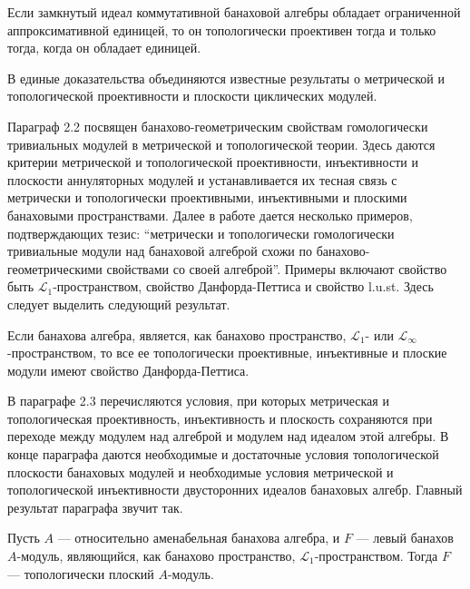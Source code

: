 \begin{theorem*}[\ref{GoodCommIdealMetTopProjIsUnital}] Если замкнутый идеал
коммутативной банаховой алгебры обладает ограниченной аппроксимативной единицей,
то он топологически проективен тогда и только тогда, когда он обладает единицей.
\end{theorem*} 

В единые доказательства объединяются известные результаты о метрической и
топологической проективности и плоскости циклических модулей. 

Параграф 2.2 посвящен банахово-геометрическим свойствам гомологически
тривиальных модулей в метрической и топологической теории. Здесь даются критерии
метрической и топологической проективности, инъективности и плоскости
аннуляторных модулей и устанавливается их тесная связь с метрически и
топологически проективными, инъективными и плоскими банаховыми пространствами.
Далее в работе дается несколько примеров, подтверждающих тезис: ``метрически и
топологически гомологически тривиальные модули над банаховой алгеброй схожи по
банахово-геометрическими свойствами со своей алгеброй''. Примеры включают
свойство быть $\mathscr{L}_1$-пространством, свойство Данфорда-Петтиса и
свойство l.u.st. Здесь следует выделить следующий результат.

\begin{theorem*}[\ref{TopProjInjFlatModOverMthscrL1OrLInftySpHaveDPP}] Если
банахова алгебра, является, как банахово пространство, $\mathscr{L}_1$- или
$\mathscr{L}_\infty$-пространством, то все ее топологически проективные,
инъективные и плоские модули имеют свойство Данфорда-Петтиса.
\end{theorem*}

В параграфе 2.3 перечисляются условия, при которых метрическая и топологическая
проективность, инъективность и плоскость сохраняются при переходе между модулем
над алгеброй и модулем над идеалом этой алгебры. В конце параграфа даются
необходимые и достаточные условия топологической плоскости банаховых модулей и
необходимые условия метрической и топологической инъективности двусторонних
идеалов банаховых алгебр. Главный результат параграфа звучит так.

\begin{theorem*}[\ref{TopL1FlatModAoverAmenBanAlg}] Пусть $A$ --- относительно
аменабельная банахова алгебра, и $F$ --- левый банахов $A$-модуль, являющийся,
как банахово пространство, $\mathscr{L}_1$-пространством. Тогда $F$ ---
топологически плоский $A$-модуль.
\end{theorem*}


